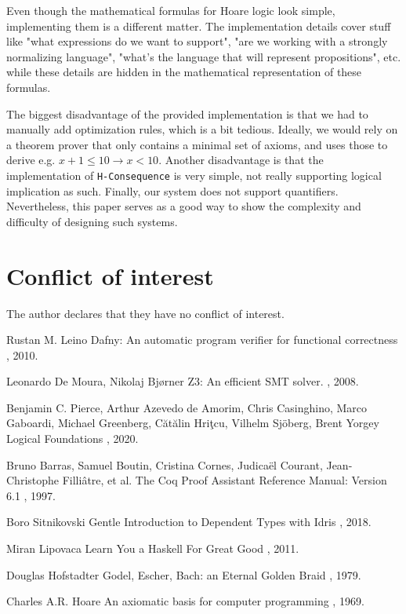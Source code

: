 \documentclass{article}
\begin{document}
Even though the mathematical formulas for Hoare logic look simple, implementing them is a different matter. The implementation details cover stuff like "what expressions do we want to support", "are we working with a strongly normalizing language", "what's the language that will represent propositions", etc. while these details are hidden in the mathematical representation of these formulas.

The biggest disadvantage of the provided implementation is that we had to manually add optimization rules, which is a bit tedious. Ideally, we would rely on a theorem prover that only contains a minimal set of axioms, and uses those to derive e.g. $x + 1 \le 10 \to x < 10$. Another disadvantage is that the implementation of \texttt{H-Consequence} is very simple, not really supporting logical implication as such. Finally, our system does not support quantifiers. Nevertheless, this paper serves as a good way to show the complexity and difficulty of designing such systems.

\section{Conflict of interest}

The author declares that they have no conflict of interest.

\begin{thebibliography}{1}

Rustan M. Leino
\newblock Dafny: An automatic program verifier for functional correctness
, 2010.

Leonardo De Moura, Nikolaj Bjørner
\newblock Z3: An efficient SMT solver.
, 2008.

Benjamin C. Pierce, Arthur Azevedo de Amorim, Chris Casinghino, Marco Gaboardi, Michael Greenberg, Cătălin Hriţcu, Vilhelm Sjöberg, Brent Yorgey
\newblock Logical Foundations
, 2020.

Bruno Barras, Samuel Boutin, Cristina Cornes, Judicaël Courant, Jean-Christophe Filliâtre, et al.
\newblock The Coq Proof Assistant Reference Manual: Version 6.1
, 1997.

Boro Sitnikovski
\newblock Gentle Introduction to Dependent Types with Idris
, 2018.

Miran Lipovaca
\newblock Learn You a Haskell For Great Good
, 2011.

Douglas Hofstadter
\newblock Godel, Escher, Bach: an Eternal Golden Braid
, 1979.

Charles A.R. Hoare
\newblock An axiomatic basis for computer programming
, 1969.

\end{thebibliography}
\end{document}
